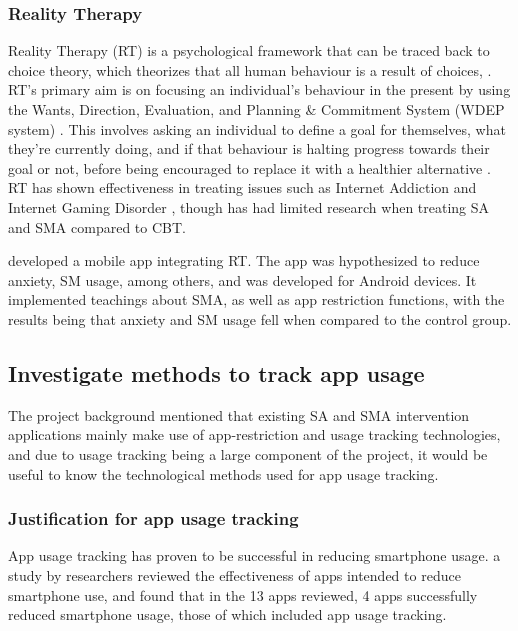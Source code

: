 \documentclass[12pt]{article}
\begin{document}
\subsubsection{Reality Therapy}
Reality Therapy (RT) is a psychological framework that can be traced back to choice theory, which theorizes that 
all human behaviour is a result
of choices, \autocite{RefWorks:RefID:143-bradley2014choice, RefWorks:RefID:145-wubbolding2016reality}. RT's primary aim is on
focusing an individual's behaviour in the present by using the Wants, Direction, Evaluation, and Planning \& 
Commitment System (WDEP system) \autocite{RefWorks:RefID:143-bradley2014choice}. This involves asking an individual
to define a goal for themselves, what they're currently doing, and if that 
behaviour is halting progress towards their goal or not, before being encouraged to replace it with a
healthier alternative \autocite{RefWorks:RefID:48-yao2017combined}. RT has shown effectiveness in treating issues
such as Internet Addiction and Internet Gaming Disorder 
\autocite{RefWorks:RefID:48-yao2017combined,RefWorks:RefID:49-zajac2017treatments}, though has had limited research
\autocite{RefWorks:RefID:143-bradley2014choice} when treating SA and SMA compared to CBT. \newline

\textcite{RefWorks:RefID:42-esmaeili2018method} developed a mobile app 
integrating RT. The app was hypothesized to reduce anxiety, SM usage, among others, and was developed for Android 
devices. It implemented teachings about SMA, as well as app restriction functions, with the results being that 
anxiety and SM usage fell when compared to the control group.


\subsection{Investigate methods to track app usage}
The project background mentioned that existing SA and SMA intervention applications mainly make use of 
app-restriction and usage tracking technologies, and due to usage tracking being a large component of the project, 
it would be useful to know the technological methods used for app usage tracking.

\subsubsection{Justification for app usage tracking}
App usage tracking has proven to be successful in reducing smartphone usage. a
study by researchers \textcite{RefWorks:RefID:125-rahmillah2023evaluating} reviewed the effectiveness of apps 
intended to reduce smartphone use, and found that in the 13 apps reviewed, 4 apps successfully reduced smartphone 
usage, those of which included app usage tracking.
\end{document}
